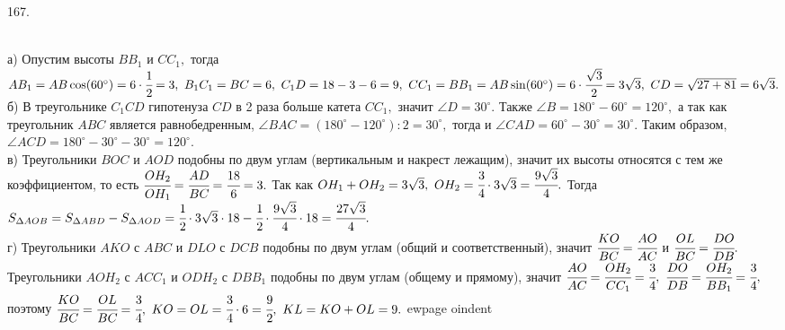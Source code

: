 167. \begin{figure}[ht!]
\end{figure}\\
а) Опустим высоты $BB_1$ и $CC_1,$ тогда $AB_1=AB\cos(60^\circ)=6\cdot\cfrac{1}{2}=3,\ B_1C_1=BC=6,\ C_1D=18-3-6=9,\ CC_1=BB_1=AB\sin(60^\circ)=6\cdot\cfrac{\sqrt{3}}{2}=3\sqrt{3},\ CD=\sqrt{27+81}=6\sqrt{3}.$\\
б) В треугольнике $C_1CD$ гипотенуза $CD$ в 2 раза больше катета $CC_1,$ значит $\angle D=30^\circ.$ Также $\angle B=180^\circ-60^\circ=120^\circ,$ а так как треугольник $ABC$ является равнобедренным, $\angle BAC=(180^\circ-120^\circ):2=30^\circ,$ тогда и $\angle CAD=60^\circ-30^\circ=30^\circ.$ Таким образом, $\angle ACD=180^\circ-30^\circ-30^\circ=120^\circ.$\\
в)  Треугольники $BOC$ и $AOD$ подобны по двум углам (вертикальным и накрест лежащим), значит их высоты относятся с тем же коэффициентом, то есть $\cfrac{OH_2}{OH_1}=\cfrac{AD}{BC}=\cfrac{18}{6}=3.$ Так как $OH_1+OH_2=3\sqrt{3},\ OH_2=\cfrac{3}{4}\cdot3\sqrt{3}=\cfrac{9\sqrt{3}}{4}.$ Тогда $S_{\Delta AOB}=S_{\Delta ABD}-S_{\Delta AOD}=\cfrac{1}{2}\cdot 3\sqrt{3}\cdot 18-\cfrac{1}{2}\cdot \cfrac{9\sqrt{3}}{4}\cdot 18=\cfrac{27\sqrt{3}}{4}.$\\
г) Треугольники $AKO$ с $ABC$ и $DLO$ с $DCB$ подобны по двум углам (общий и соответственный), значит $\cfrac{KO}{BC}=\cfrac{AO}{AC}$ и $\cfrac{OL}{BC}=\cfrac{DO}{DB}.$ Треугольники $AOH_2$ с $ACC_1$ и $ODH_2$ с $DBB_1$ подобны по двум углам (общему и прямому), значит $\cfrac{AO}{AC}=\cfrac{OH_2}{CC_1}=\cfrac{3}{4},\ \cfrac{DO}{DB}=\cfrac{OH_2}{BB_1}=\cfrac{3}{4},$ поэтому $\cfrac{KO}{BC}=\cfrac{OL}{BC}=\cfrac{3}{4},\
KO=OL=\cfrac{3}{4}\cdot6=\cfrac{9}{2},\ KL=KO+OL=9.$
ewpage
oindent
